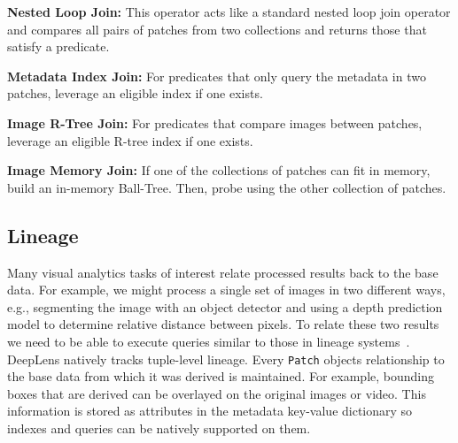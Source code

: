 \vspace{0.25em}
\noindent \textbf{Nested Loop Join: } This operator acts like a standard nested loop join operator and compares all pairs of patches from two collections and returns those that satisfy a predicate.

\vspace{0.25em}
\noindent \textbf{Metadata Index Join: } For predicates that only query the metadata in two patches, leverage an eligible index if one exists. 

\vspace{0.25em}
\noindent \textbf{Image R-Tree Join: } For predicates that compare images between patches, leverage an eligible R-tree index if one exists. 

\vspace{0.25em}
\noindent \textbf{Image Memory Join: } If one of the collections of patches can fit in memory, build an in-memory Ball-Tree. Then, probe using the other collection of patches.

\subsection{Lineage}
Many visual analytics tasks of interest relate processed results back to the base data.
For example, we might process a single set of images in two different ways, e.g., segmenting the image with an object detector and using a depth prediction model to determine relative distance between pixels.
To relate these two results we need to be able to execute queries similar to those in lineage systems~\cite{psallidas2018smoke}. 
\textsf{DeepLens} natively tracks tuple-level lineage.
Every \texttt{Patch} objects relationship to the base data from which it was derived is maintained.
For example, bounding boxes that are derived can be overlayed on the original images or video.
This information is stored as attributes in the metadata key-value dictionary so indexes and queries can be natively supported on them.
